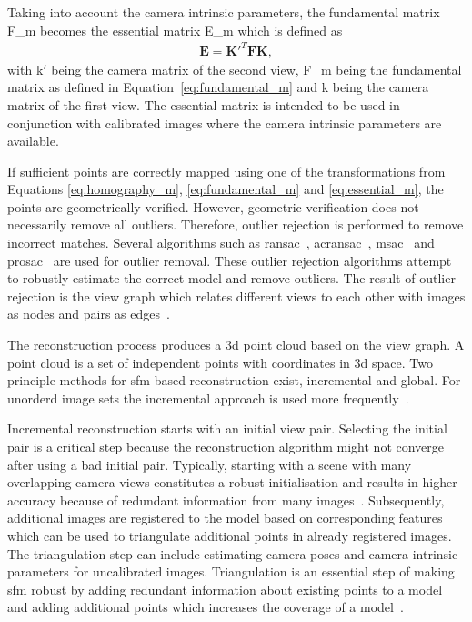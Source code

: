 Taking into account the camera intrinsic parameters, the fundamental matrix \gls{F_m} becomes the essential matrix \gls{E_m} which is defined as
\begin{align}
    \textbf{E} = \textbf{K}'^{T}\textbf{F}\textbf{K}, \label{eq:essential_m}
\end{align}
with \gls{k}$'$ being the camera matrix of the second view, \gls{F_m} being the fundamental matrix as defined in Equation~\ref{eq:fundamental_m} and \gls{k} being the camera matrix of the first view. The essential matrix is intended to be used in conjunction with calibrated images where the camera intrinsic parameters are available.

If sufficient points are correctly mapped using one of the transformations from Equations \ref{eq:homography_m}, \ref{eq:fundamental_m} and \ref{eq:essential_m}, the points are geometrically verified. However, geometric verification does not necessarily remove all outliers. Therefore, outlier rejection is performed to remove incorrect matches. Several algorithms such as \gls{ransac}~\cite{Fischler1981RandomCartography}, \gls{acransac}~\cite{moisan2012automatic}, \gls{msac}~\cite{wang2009generalized} and \gls{prosac}~\cite{Chum2005MatchingConsensus} are used for outlier removal. These outlier rejection algorithms attempt to robustly estimate the correct model and remove outliers. The result of outlier rejection is the view graph which relates different views to each other with images as nodes and pairs as edges~\cite{schonberger2016structure}.

The reconstruction process produces a \gls{3d} point cloud based on the view graph. A point cloud is a set of independent points with coordinates in \gls{3d} space. Two principle methods for \gls{sfm}-based reconstruction exist, incremental and global. For unorderd image sets the incremental approach is used more frequently~\cite{schonberger2016structure}.

Incremental reconstruction starts with an initial view pair. Selecting the initial pair is a critical step because the reconstruction algorithm might not converge after using a bad initial pair. Typically, starting with a scene with many overlapping camera views constitutes a robust initialisation and results in higher accuracy because of redundant information from many images~\cite{schonberger2016structure}.
Subsequently, additional images are registered to the model based on corresponding features which can be used to triangulate additional points in already registered images. The triangulation step can include estimating camera poses and camera intrinsic parameters for uncalibrated images. Triangulation is an essential step of making \gls{sfm} robust by adding redundant information about existing points to a model and adding additional points which increases the coverage of a model~\cite{schonberger2016structure}.

